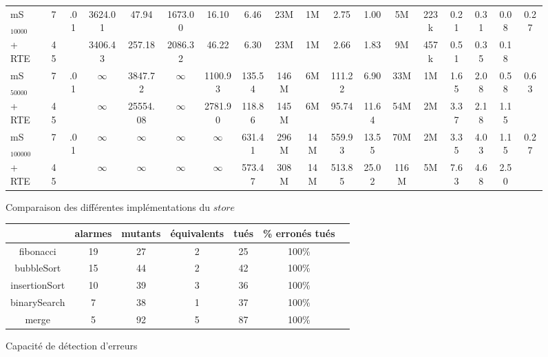 \documentclass[french]{spimufcphdthesis}
\begin{document}
\begin{landscape}
\begin{figure}[h]
\begin{tabular}{|l|c|c|c|c|c|c|c|c|c|c|c|c|c|c|c|c|c|}
    \hline
mS$_{10000}$ &7 &\multirow{2}{*}{.01} &3624.01 &47.94 &1673.00 &16.10 &6.46 &23M &1M &2.75 &1.00 &5M &223k &0.21 &0.31 &0.08 &\multirow{2}{*}{0.27}\\
+ RTE &45 &&3406.43 &257.18 &2086.32 &46.22 &6.30 &23M &1M &2.66 &1.83 &9M &457k &0.51 &0.35 &0.18 &\\
\hline
mS$_{50000}$ &7 &\multirow{2}{*}{.01} &$\infty$ &3847.72 &$\infty$ &1100.93 &135.54 &146M &6M &111.22 &6.90 &33M &1M &1.65 &2.08 &0.58 &\multirow{2}{*}{0.63}\\
+ RTE &45 &&$\infty$ &25554.08 &$\infty$ &2781.90 &118.86 &145M &6M &95.74 &11.64 &54M &2M &3.37 &2.18 &1.15 &\\
\hline
mS$_{100000}$ &7 &\multirow{2}{*}{.01} &$\infty$ &$\infty$ &$\infty$ &$\infty$ &631.41 &296M &14M &559.93 &13.55 &70M &2M &3.35 &4.03 &1.15 &\multirow{2}{*}{0.27}\\
+ RTE &45 &&$\infty$ &$\infty$ &$\infty$ &$\infty$ &573.47 &308M &14M &513.85 &25.02 &116M &5M &7.63 &4.68 &2.50 &\\
\hline
  \end{tabular}
  \caption{Comparaison des différentes implémentations du $store$}
\end{figure}
\label{fig:mmodel-exp}
\end{landscape}






\begin{figure}[t]
  \centering
  \begin{tabular}{|c|c|c|c|c|c|c|}
    \hline
    & alarmes & mutants & équivalents & tués & \% erronés tués \\
    \hline
    fibonacci & 19  & 27 & 2 & 25 & 100\% \\
    \hline
    bubbleSort & 15  & 44 & 2 & 42 & 100\% \\
    \hline
    insertionSort & 10  & 39 & 3 & 36 & 100\% \\
    \hline
    binarySearch & 7 & 38 & 1 & 37 & 100\% \\
    \hline
    merge & 5 & 92 & 5 & 87 & 100\% \\
    \hline
  \end{tabular}
  \vspace{-2mm}
  \caption{Capacité de détection d'erreurs}
  \vspace{-2mm}
  \label{fig:mutation-exp}
\end{figure}
\end{document}
